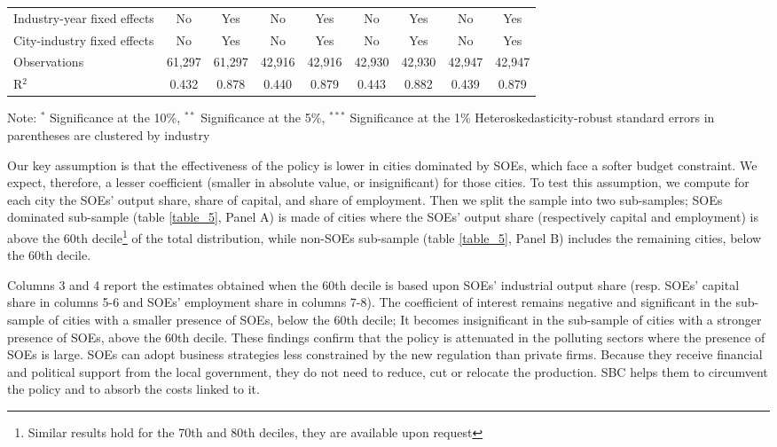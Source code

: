 \documentclass[12pt]{article}
\begin{document}
\begin{table}[!htb]
\begin{adjustbox}{width=\textwidth, totalheight=\baselineskip,keepaspectratio}
\begin{tabular}{@{\extracolsep{5pt}}lcccccccc}
Industry-year fixed effects & No & Yes & No & Yes & No & Yes & No & Yes \\ 
City-industry fixed effects & No & Yes & No & Yes & No & Yes & No & Yes \\ 
Observations & 61,297 & 61,297 & 42,916 & 42,916 & 42,930 & 42,930 & 42,947 & 42,947 \\ 
R$^{2}$ & 0.432 & 0.878 & 0.440 & 0.879 & 0.443 & 0.882 & 0.439 & 0.879 \\ 
    \end{tabular}
    \end{adjustbox}
    \begin{tablenotes}
      \small
      \item 
      Note: $^{*}$ Significance at the 10\%, $^{**}$ Significance at the 5\%, $^{***}$ Significance at the 1\% Heteroskedasticity-robust standard errors in parentheses are clustered by industry
\end{tablenotes}
\end{table}




Our key assumption is that the effectiveness of the policy is lower in cities dominated by SOEs, which face a softer budget constraint. We expect, therefore, a lesser coefficient (smaller in absolute value, or insignificant) for those cities. To test this assumption, we compute for each city the SOEs' output share, share of capital, and share of employment. Then we split the sample into two sub-samples; SOEs dominated sub-sample (table \ref{table_5}, Panel A) is made of cities where the SOEs' output share (respectively capital and employment) is above the 60th decile\footnote{ Similar results hold for the 70th and 80th deciles, they are available upon request } of the total distribution, while non-SOEs sub-sample (table \ref{table_5}, Panel B) includes the remaining cities, below the 60th decile. 


Columns 3 and 4 report the estimates obtained when the 60th decile is based upon SOEs' industrial output share (resp. SOEs' capital share in columns 5-6 and SOEs' employment share in columns 7-8). The coefficient of interest remains negative and significant in the sub-sample of cities with a smaller presence of SOEs, below the 60th decile; It becomes insignificant in the sub-sample of cities with a stronger presence of SOEs, above the 60th decile. These findings confirm that the policy is attenuated in the polluting sectors where the presence of SOEs is large. SOEs can adopt business strategies less constrained by the new regulation than private firms. Because they receive financial and political support from the local government, they do not need to reduce, cut or relocate the production. SBC helps them to circumvent the policy and to absorb the costs linked to it. 
\end{document}
